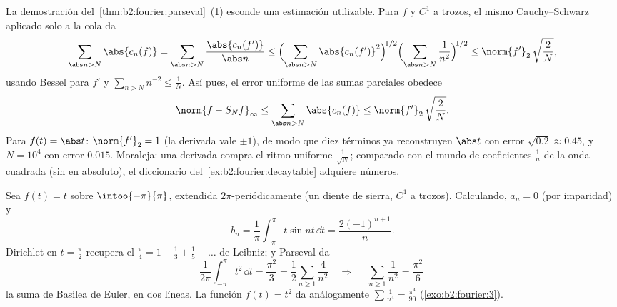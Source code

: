 \begin{example}\label{ex:b2:fourier:tailbound}
La demostración del~\cref{thm:b2:fourier:parseval}~(1) esconde una
estimación utilizable. Para $f$  y $C^1$ a trozos, el mismo
Cauchy--Schwarz aplicado solo a la cola da
\[
\sum_{\abs n > N}\abs{c_n(f)}
= \sum_{\abs n > N}\frac{\abs{c_n(f')}}{\abs n}
\leq \Bigl(\sum_{\abs n > N}\abs{c_n(f')}^2\Bigr)^{\!1/2}
\Bigl(\sum_{\abs n>N}\frac{1}{n^2}\Bigr)^{\!1/2}
\leq \norm{f'}_2\,\sqrt{\frac{2}{N}} ,
\]
usando Bessel para $f'$ y $\sum_{n>N}n^{-2} \leq \frac1N$. Así pues,
el error uniforme de las sumas parciales obedece
\[
\norm{f - S_Nf}_\infty
\leq \sum_{\abs n>N}\abs{c_n(f)}
\leq \norm{f'}_2\,\sqrt{\frac2N} .
\]
Para $f(t) = \abs t$: $\norm{f'}_2 = 1$ (la derivada vale $\pm1$), de
modo que diez términos ya reconstruyen $\abs t$  con
error $\sqrt{0.2} \approx 0.45$, y $N = 10^4$ con error
$0.015$. Moraleja: una derivada compra el ritmo uniforme
$\frac{1}{\sqrt N}$; comparado con el mundo de coeficientes $\frac1n$
de la onda cuadrada (sin  en absoluto), el
diccionario del~\cref{ex:b2:fourier:decaytable} adquiere números.
\end{example}

\begin{example}\label{ex:b2:fourier:basel}
Sea $f(t) = t$ sobre $\intoo{-\pi}{\pi}$, extendida
$2\pi$-periódicamente (un diente de sierra, $C^1$ a trozos).
Calculando, $a_n = 0$ (por imparidad) y
\[
b_n = \frac{1}{\pi}\int_{-\pi}^{\pi} t\sin nt\,\dd t
= \frac{2(-1)^{n+1}}{n} .
\]
Dirichlet en $t = \frac\pi2$ recupera el $\frac\pi4 = 1 - \frac13 +
\frac15 - \dots$ de Leibniz; y Parseval da
\[
\frac{1}{2\pi}\int_{-\pi}^{\pi} t^2\,\dd t = \frac{\pi^2}{3}
= \frac12\sum_{n\geq1}\frac{4}{n^2}
\quad\Longrightarrow\quad
\boxed{\;\sum_{n\geq1}\frac{1}{n^2} = \frac{\pi^2}{6}\;}
\]
la suma de Basilea de Euler, en dos líneas. La función $f(t) = t^2$
da análogamente $\sum \frac1{n^4} = \frac{\pi^4}{90}$
(\cref{exo:b2:fourier:3}).
\end{example}

